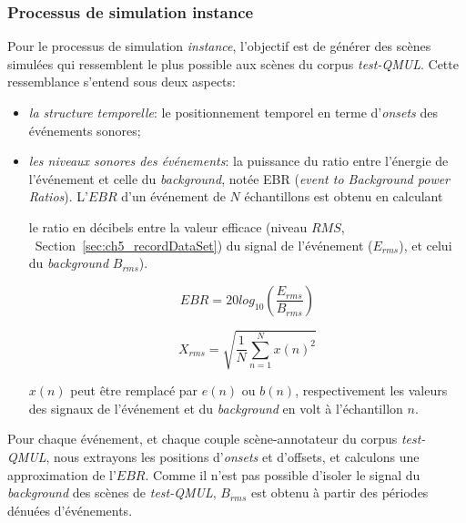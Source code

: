 
\subsubsection{Processus de simulation instance}
\label{sec:ch7_simuProcessInstance}

Pour le processus de simulation \emph{instance}, l'objectif est de générer des scènes simulées qui ressemblent le plus possible aux scènes du corpus \emph{test-QMUL}. Cette ressemblance s'entend sous deux aspects:

\begin{itemize}
\item \emph{la structure temporelle}: le positionnement temporel en terme d'\emph{onsets} des événements sonores;
\item \emph{les niveaux sonores des événements}: la puissance du ratio entre l'énergie de l'événement et celle du \emph{background}, notée EBR (\emph{event to Background power Ratios}). L'$EBR$ d'un événement de $N$ échantillons est obtenu en calculant 

le ratio en décibels entre la valeur efficace (niveau $RMS$, \cf~Section~\ref{sec:ch5_recordDataSet}) du signal de l'événement ($E_{rms}$), et celui du \emph{background}  $B_{rms}$).

\begin{equation}
\label{eq:ch7_eq1}
EBR=20log_{10} \left(  \dfrac{E_{rms}}{B_{rms}} \right) 
\end{equation}

\begin{equation}
\label{eq:ch7_eq2}
X_{rms}=\sqrt{\dfrac{1}{N} \sum_{n=1}^{N} x(n)^2}
\end{equation}

$x(n)$ peut être remplacé par $e(n)$ ou $b(n)$, respectivement les valeurs des signaux de l'événement et du \emph{background} en volt à l'échantillon $n$. 
\end{itemize}

Pour chaque événement, et chaque couple scène-annotateur du corpus \emph{test-QMUL}, nous extrayons les positions d'\emph{onsets} et d'{offsets}, et calculons une approximation de l'$EBR$. Comme il n'est pas possible d'isoler le signal du \emph{background} des scènes de \emph{test-QMUL}, $B_{rms}$ est obtenu à partir des périodes dénuées d'événements. \\
 


